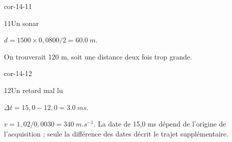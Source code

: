 \begin{blocLivre}{cor-14-11}\begin{corrige}{11}{Un sonar}
\begin{questions}
\item $d=1500\times0,0800/2=\qty{60,0}{m}$.
\item On trouverait 120 m, soit une distance deux fois trop grande.
\end{questions}
\end{corrige}\end{blocLivre}
\begin{blocLivre}{cor-14-12}\begin{corrige}{12}{Un retard mal lu}
\begin{questions}
\item $\Delta t=15,0-12,0=\qty{3,0}{ms}$.
\item $v=1,02/0,0030=\qty{340}{m.s^{-1}}$. La date de 15,0 ms dépend de l’origine de l’acquisition ; seule la différence des dates décrit le trajet supplémentaire.
\end{questions}
\end{corrige}\end{blocLivre}

